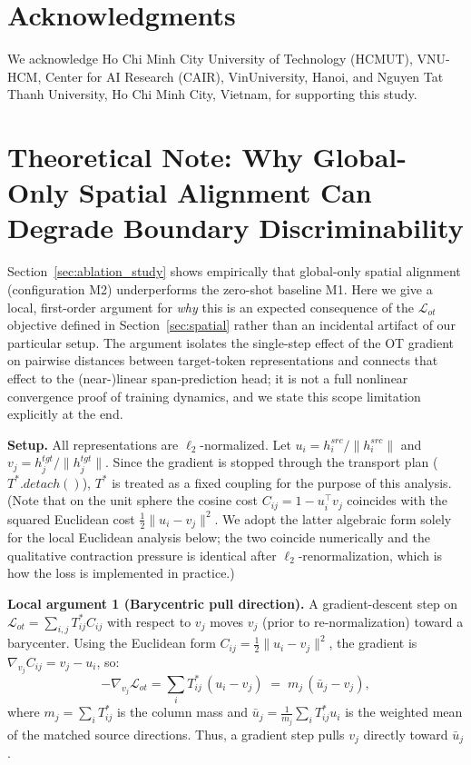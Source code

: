 \documentclass[11pt]{article}
\begin{document}
\section*{Acknowledgments}
We acknowledge Ho Chi Minh City University of Technology (HCMUT), VNU-HCM, Center for AI Research (CAIR), VinUniversity, Hanoi, and Nguyen Tat Thanh University, Ho Chi Minh City, Vietnam, for supporting this study.

%



\appendix

\section{Theoretical Note: Why Global-Only Spatial Alignment Can Degrade Boundary Discriminability}
\label{sec:appendix_ot_theory}

Section~\ref{sec:ablation_study} shows empirically that global-only spatial alignment (configuration M2) underperforms the zero-shot baseline M1. Here we give a local, first-order argument for \emph{why} this is an expected consequence of the $\mathcal{L}_{ot}$ objective defined in Section~\ref{sec:spatial} rather than an incidental artifact of our particular setup. The argument isolates the single-step effect of the OT gradient on pairwise distances between target-token representations and connects that effect to the (near-)linear span-prediction head; it is not a full nonlinear convergence proof of training dynamics, and we state this scope limitation explicitly at the end.

\textbf{Setup.} All representations are $\ell_2$-normalized. Let $u_i = h_i^{src}/\|h_i^{src}\|$ and $v_j = h_j^{tgt}/\|h_j^{tgt}\|$. Since the gradient is stopped through the transport plan ($T^*.detach()$), $T^*$ is treated as a fixed coupling for the purpose of this analysis. (Note that on the unit sphere the cosine cost $C_{ij}=1-u_i^\top v_j$ coincides with the squared Euclidean cost $\frac12\|u_i-v_j\|^2$. We adopt the latter algebraic form solely for the local Euclidean analysis below; the two coincide numerically and the qualitative contraction pressure is identical after $\ell_2$-renormalization, which is how the loss is implemented in practice.)

\textbf{Local argument 1 (Barycentric pull direction).} A gradient-descent step on $\mathcal{L}_{ot} = \sum_{i,j} T^*_{ij}C_{ij}$ with respect to $v_j$ moves $v_j$ (prior to re-normalization) toward a barycenter. Using the Euclidean form $C_{ij} = \frac{1}{2}\|u_i - v_j\|^2$, the gradient is $\nabla_{v_j} C_{ij} = v_j - u_i$, so:
\begin{equation*}
-\nabla_{v_j}\mathcal{L}_{ot} = \sum_i T^*_{ij}\, (u_i - v_j) \;=\; m_j\,(\bar{u}_j - v_j),
\end{equation*}
where $m_j = \sum_i T^*_{ij}$ is the column mass and $\bar{u}_j = \frac{1}{m_j} \sum_i T^*_{ij} u_i$ is the weighted mean of the matched source directions. Thus, a gradient step pulls $v_j$ directly toward $\bar{u}_j$.
\end{document}

